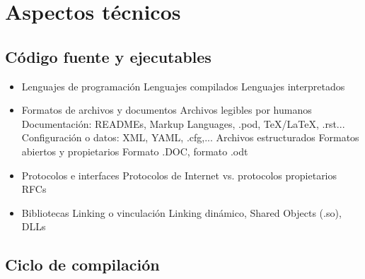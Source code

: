  
\section{Aspectos técnicos}
\subsection {Código fuente y ejecutables} 
\begin{itemize}
	\item Lenguajes de programación
	\subitem Lenguajes compilados
	\subitem Lenguajes interpretados
	\item Formatos de archivos y documentos
	\subitem Archivos legibles por humanos
	\subsubitem Documentación: READMEs, Markup Languages, .pod, TeX/LaTeX, .rst...
	\subsubitem Configuración o datos: XML, YAML, .cfg,...
	\subitem Archivos estructurados
	\subsubitem Formatos abiertos y propietarios
	\subsubitem Formato .DOC, formato .odt
	\item Protocolos e interfaces
	\subitem Protocolos de Internet vs. protocolos propietarios
	\subitem RFCs 
	\item Bibliotecas
	\subitem Linking o vinculación
	\subitem Linking dinámico, Shared Objects (.so), DLLs
\end{itemize}

\subsection {Ciclo de compilación}






